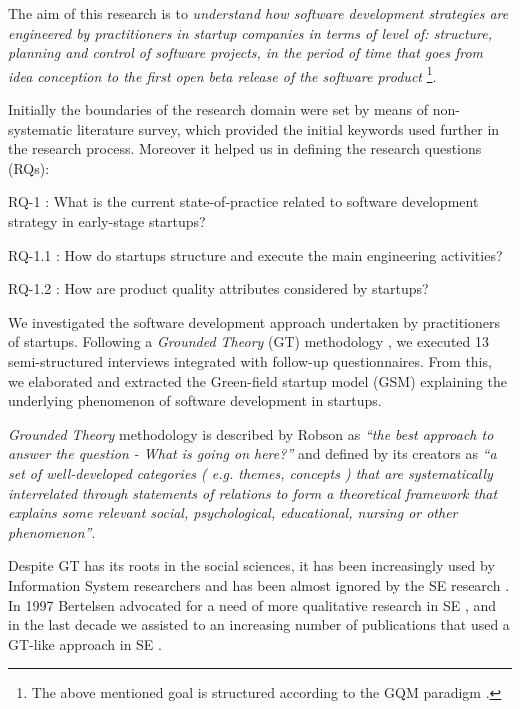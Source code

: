 \documentclass[10pt,journal,letterpaper,compsoc]{IEEEtran}
\begin{document}
The aim of this research is to \textit{understand how software development 
strategies are engineered by practitioners in startup companies in terms of 
level of: structure, planning and control of software projects, in the period of 
time  that goes from idea conception to the first open beta release of the 
software product} \footnote{The above mentioned goal is structured according to 
the GQM paradigm \cite{Basili1992}.}.

Initially the boundaries of the research domain were set by means of 
non-systematic literature survey, which provided the initial keywords used 
further in the research process. Moreover it helped us in defining the research 
questions (RQs):


\begin{compactitem}

\item RQ-1 : What is the current state-of-practice related to software 
development strategy in early-stage startups?
\begin{compactitem}

\item RQ-1.1 : How do startups structure and execute the main engineering 
activities?
\item RQ-1.2 : How are product quality attributes considered by startups?
\end{compactitem}

\end{compactitem}

We investigated the software development approach undertaken by practitioners 
of startups. Following a \textit{Grounded Theory} (GT) methodology 
\cite{Glaser1978}, we executed 13 semi-structured interviews integrated with 
follow-up questionnaires. From this, we elaborated and extracted the Green-field 
startup model (GSM) explaining the underlying phenomenon of software development 
in startups.

\textit{Grounded Theory} methodology is described by Robson as \textit{``the 
best approach to answer the question - What is going on here?''} and defined by 
its creators \cite{ColinRobson2009} as \textit{``a set of well-developed 
categories ( e.g. themes, concepts ) that are systematically interrelated 
through statements of relations to form a theoretical framework that explains 
some relevant social, psychological, educational, nursing or other 
phenomenon''}.

Despite GT has its roots in the social sciences, it has been increasingly used 
by Information System researchers and has been almost ignored by the SE research 
\cite{Coleman2007}. In 1997 Bertelsen advocated for a need of more qualitative 
research in SE \cite{Bertelsen1997}, and in the last decade we assisted to an 
increasing number of publications that used a GT-like approach in SE 
\cite{Coleman2008a,Coleman2007, Sulayman2012}.
\end{document}

